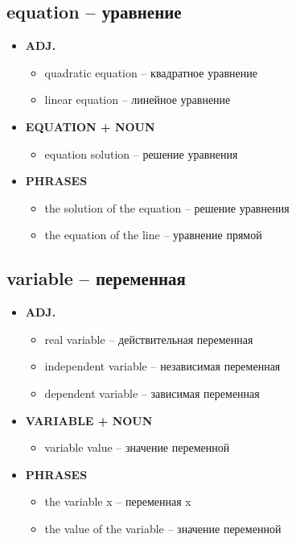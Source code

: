 \documentclass[a4paper, 10pt]{article}
\theoremstyle{definition}
\theoremstyle{plain}
\theoremstyle{remark}
\begin{document}
\subsection{equation – уравнение}

\begin{itemize}
    \item \textbf{ADJ.}
    \begin{itemize}
        \item quadratic equation – квадратное уравнение
        \item linear equation – линейное уравнение
    \end{itemize}
    
    \item \textbf{EQUATION + NOUN}
    \begin{itemize}
        \item equation solution – решение уравнения
    \end{itemize}
    
    \item \textbf{PHRASES}
    \begin{itemize}
        \item the solution of the equation – решение уравнения
        \item the equation of the line – уравнение прямой
    \end{itemize}
\end{itemize}

\subsection{variable – переменная}

\begin{itemize}
    \item \textbf{ADJ.}
    \begin{itemize}
        \item real variable – действительная переменная
        \item independent variable – независимая переменная
        \item dependent variable – зависимая переменная
    \end{itemize}
    
    \item \textbf{VARIABLE + NOUN}
    \begin{itemize}
        \item variable value – значение переменной
    \end{itemize}
    
    \item \textbf{PHRASES}
    \begin{itemize}
        \item the variable x – переменная x
        \item the value of the variable – значение переменной
    \end{itemize}
\end{itemize}
\end{document}
